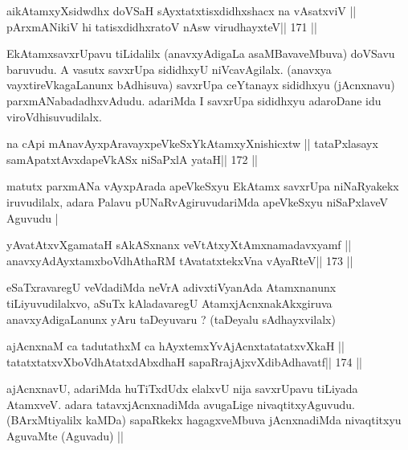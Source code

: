 
\begin{shl}
aikAtamxyXsidwdhx doVSaH sAyxtatxtisxdidhxshacx na vAsatxviV ||
pArxmANikiV hi tatisxdidhxratoV nAsw virudhayxteV\hfill || 171 ||
\end{shl}

\begin{artha}
EkAtamxsavxrUpavu tiLidalilx (anavxyAdigaLa asaMBavaveMbuva) doVSavu 
baruvudu. A vasutx savxrUpa sididhxyU niVcavAgilalx. (anavxya 
vayxtireVkagaLanunx bAdhisuva) savxrUpa ceYtanayx sididhxyu (jAcnxnavu) parxmANabadadhxvAdudu. adariMda I savxrUpa sididhxyu adaroDane idu viroVdhisuvudilalx.
\end{artha}

\begin{shl}
na cApi mAnavAyxpAravayxpeVkeSxYkAtamxyXnishicxtw ||
tataPxlasayx samApatxtAvxdapeVkASx niSaPxlA yataH\hfill || 172 ||
\end{shl}

\begin{artha}
matutx parxmANa vAyxpArada apeVkeSxyu EkAtamx savxrUpa niNaRyakekx iruvudilalx, adara Palavu pUNaRvAgiruvudariMda apeVkeSxyu niSaPxlaveV Aguvudu |
\end{artha}

\begin{shl}
yAvatAtxvXgamataH sAkASxnanx veVtAtxyXtAmxnamadavxyamf ||
anavxyAdAyxtamxboVdhAthaRM tAvatatxtekxVna vAyaRteV\hfill || 173 ||
\end{shl}

\begin{artha}
eSaTxravaregU veVdadiMda neVrA adivxtiVyanAda Atamxnanunx tiLiyuvudilalxvo, aSuTx kAladavaregU AtamxjAcnxnakAkxgiruva anavxyAdigaLanunx yAru taDeyuvaru ? (taDeyalu sAdhayxvilalx)
\end{artha}

\begin{shl}
ajAcnxnaM ca tadutathxM ca hAyxtemxYvAjAcnxtatatatxvXkaH ||
tatatxtatxvXboVdhAtatxdAbxdhaH sapaRrajAjxvXdibAdhavatf\hfill || 174 ||
\end{shl}

\begin{artha}
ajAcnxnavU, adariMda huTiTxdUdx elalxvU nija savxrUpavu tiLiyada 
AtamxveV. adara tatavxjAcnxnadiMda avugaLige nivaqtitxyAguvudu. 
(BArxMtiyalilx kaMDa) sapaRkekx hagagxveMbuva jAcnxnadiMda nivaqtitxyu 
AguvaMte (Aguvadu) ||
\end{artha}

